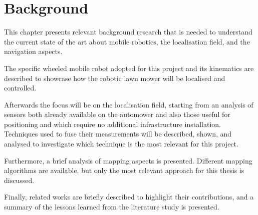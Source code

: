 \chapter{Background}
\label{ch:background}





\noindent This chapter presents relevant background research that is needed to understand the current state of the art about mobile robotics, the localisation field, and the navigation aspects. 

The specific wheeled mobile robot adopted for this project and its kinematics are described to showcase how the robotic lawn mower will be localised and controlled.

Afterwards the focus will be on the localisation field, starting from an analysis of sensors both already available on the automower and also those useful for positioning and which require no additional infrastructure installation.
Techniques used to fuse their measurements will be described, shown, and analysed to investigate which technique is the most relevant for this project.

Furthermore, a brief analysis of mapping aspects is presented. 
Different mapping algorithms are available, but only the most relevant approach for this thesis is discussed.

Finally, related works are briefly described to highlight their contributions, and a summary of the lessons learned from the literature study is presented. 
 

